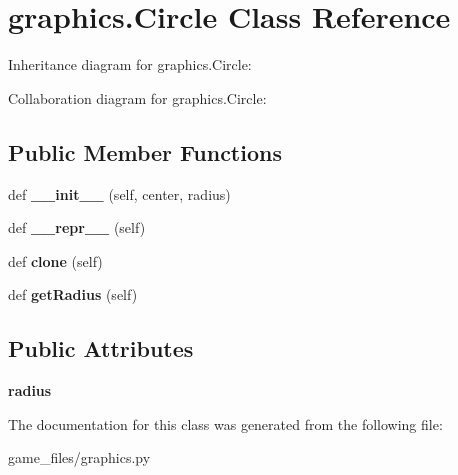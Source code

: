 \hypertarget{classgraphics_1_1Circle}{}\section{graphics.\+Circle Class Reference}
\label{classgraphics_1_1Circle}


Inheritance diagram for graphics.\+Circle\+:


Collaboration diagram for graphics.\+Circle\+:
\subsection*{Public Member Functions}
\begin{DoxyCompactItemize}
\item 
def {\bfseries \+\_\+\+\_\+init\+\_\+\+\_\+} (self, center, radius)\hypertarget{classgraphics_1_1Circle_adf9ab62e2d952cf52cfecba9acfd5660}{}\label{classgraphics_1_1Circle_adf9ab62e2d952cf52cfecba9acfd5660}

\item 
def {\bfseries \+\_\+\+\_\+repr\+\_\+\+\_\+} (self)\hypertarget{classgraphics_1_1Circle_a7acb1acc63613799ff2724cb05d75750}{}\label{classgraphics_1_1Circle_a7acb1acc63613799ff2724cb05d75750}

\item 
def {\bfseries clone} (self)\hypertarget{classgraphics_1_1Circle_ae575b71c63ce889e4c872c792d748f7b}{}\label{classgraphics_1_1Circle_ae575b71c63ce889e4c872c792d748f7b}

\item 
def {\bfseries get\+Radius} (self)\hypertarget{classgraphics_1_1Circle_a420b2e69c4d116c094dc6bd6b1e81839}{}\label{classgraphics_1_1Circle_a420b2e69c4d116c094dc6bd6b1e81839}

\end{DoxyCompactItemize}
\subsection*{Public Attributes}
\begin{DoxyCompactItemize}
\item 
{\bfseries radius}\hypertarget{classgraphics_1_1Circle_aacc54bd0a94edd646405c8718cbeb47c}{}\label{classgraphics_1_1Circle_aacc54bd0a94edd646405c8718cbeb47c}

\end{DoxyCompactItemize}


The documentation for this class was generated from the following file\+:\begin{DoxyCompactItemize}
\item 
game\+\_\+files/graphics.\+py\end{DoxyCompactItemize}
